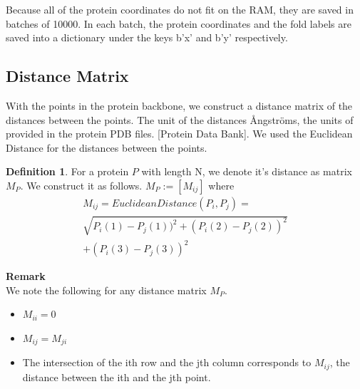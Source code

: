 \documentclass[12pt, a4paper, twocolumn, fullpage]{article}
\theoremstyle{plain}
\theoremstyle{definition}
\newtheorem{defn}{Definition}[section]
\theoremstyle{remark}
\begin{document}
Because all of the protein coordinates do not fit on the RAM, they are saved in batches of 10000. In each batch, the protein coordinates and the fold labels are saved into a dictionary under the keys b'x' and b'y' respectively.

\subsection{ Distance Matrix}
With the points in the protein backbone, we construct a distance matrix of the distances between the points. The unit of the distances Ångströms, the units of provided in the protein PDB files. [Protein Data Bank]. We used the Euclidean Distance for the distances between the points.\\

    
\begin{defn}
    For a protein $P$ with length N, we denote it's distance as matrix $M_{P}$.
    We construct it as follows.
    $ M_{P} := [M_{ij}] $ where 
    \begin{multline*}
    M_{ij} = Euclidean Distance(P_i, P_j) = \\ \sqrt{P_i(1)-P_j(1))^2+(P_i(2)-P_j(2))^2} \\ +(P_i(3)-P_j(3))^2
    \end{multline*}
\end{defn}

\noindent
\textbf{Remark}\\
We note the following for any distance matrix $M_{P}$.
    \begin{itemize}
        \item $M_{ii} = 0$
        \item $M_{ij} = M_{ji}$
        \item The intersection of the ith row and the jth column corresponds to $M_{ij}$, the distance between the ith and the jth point.
    \end{itemize}
    
\end{document}
